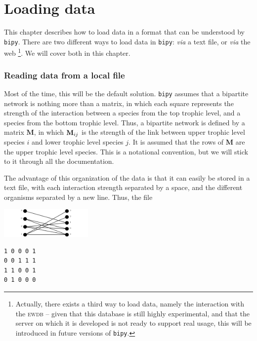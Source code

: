 \documentclass[nols,b5paper]{tufte-book}
\begin{document}
\chapter{Loading data}

This chapter describes how to load data in a format that can be understood by \texttt{bipy}. There are two different ways to load data in \texttt{bipy}: \emph{via} a text file, or \emph{via} the web \footnote{Actually, there exists a third way to load data, namely the interaction with the \textsc{ewdb} -- given that this database is still highly experimental, and that the server on which it is developed is not ready to support real usage, this will be introduced in future versions of \texttt{bipy}. }. We will cover both in this chapter.

\subsection{Reading data from a local file}

Most of the time, this will be the default solution. \texttt{bipy} assumes that a bipartite network is nothing more than a matrix, in which each square represents the strength of the interaction between a species from the top trophic level, and a species from the bottom trophic level. Thus, a bipartite network is defined by a matrix $\mathbf{M}$, in which $\mathbf{M}\sb{ij}$ is the strength of the link between upper trophic level species $i$ and lower trophic level species $j$. It is assumed that the rows of $\mathbf{M}$ are the upper trophic level species. This is a notational convention, but we will stick to it through all the documentation.

The advantage of this organization of the data is that it can easily be stored in a text file, with each interaction strength separated by a space, and the different organisms separated by a new line. Thus, the file

\begin{marginfigure}[3cm]
	\includegraphics[width=4.5cm]{ex-1}
\end{marginfigure}

\begin{verbatim}
1 0 0 0 1
0 0 1 1 1
1 1 0 0 1
0 1 0 0 0
\end{verbatim}
\end{document}
